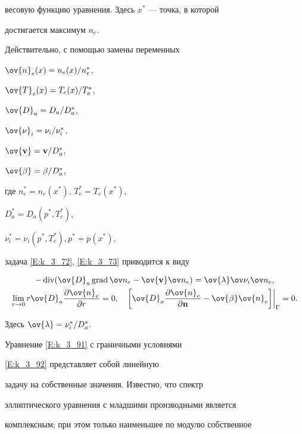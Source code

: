 весовую функцию уравнения. Здесь $x^\ast$ --- точка, в которой


достигается максимум $n_e$.





Действительно, с помощью замены переменных


$\ov{n}_{e}(x)={n_{e}(x)}/n_e^\ast$,


$\ov{T}_{e}(x)={T_{e}(x)}/T_e^\ast$,


$\ov{D}_{a}={D}_{a}/ D_a^\ast$,


$\ov{\nu}_{i}={\nu}_{i} /{\nu}_{i}^\ast$,


$\ov{\bold {v}}={\bold {v}}/D_a^\ast$,


$\ov{\beta}=\beta / D_a^\ast$,


где $n_e^\ast=n_e(x^\ast)$, $T_e^\ast=T_e(x^\ast)$,


$D_a^\ast=D_a (p^\ast, T_e^\ast)$,


${\nu}_{i} ^\ast={\nu}_{i} (p^\ast, T_e^\ast), p^\ast=p(x^\ast)$,


задача \eqref{E:k_3_72}, \eqref{E:k_3_73} приводится к виду


\begin{gather}


- \Div(\ov{D}_{a} \grad \ov n_{e} -


\ov{\bold v}\ov n_{e})=\ov{\lambda}


\ov\nu_{i}\ov n _{e}, \label{E:k_3_91} \\


%


\lim_{r \to 0} r \ov {D}_{a} \frac{\partial\ov{n}_e}{\partial r}=0,\quad


\bigg[\ov{D}_a \frac{\partial \ov{n}_e}{\partial \bold{n}} -\ov{\beta}


\ov{n}_e\bigg]\bigg|_\Gamma=0. \label{E:k_3_92}


\end{gather}


Здесь $\ov{\lambda}={\nu}_{i} ^\ast/D_a^\ast $.





Уравнение \eqref{E:k_3_91} с граничными условиями


\eqref{E:k_3_92} представляет собой линейную


задачу на собственные значения. Известно, что спектр


эллиптического уравнения с младшими производными является


комплексным; при этом только наименьшее по модулю собственное


